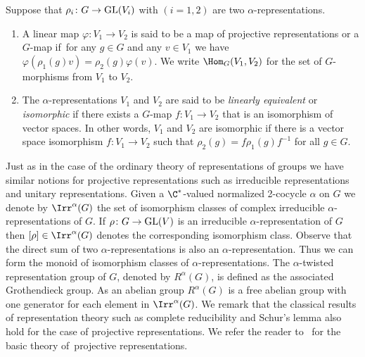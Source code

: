\begin{Def}
Suppose that $\rho_{i}\colon G\rightarrow {\rm GL}(V_{i})$ with $(i=1,2)$ are two $\alpha$-representations.
\begin{enumerate}\itemsep=0pt
\item A linear map $\varphi\colon V_{1}\to V_{2}$ is said to be a map of projective representations or a
$G$-map if~for any $g\in G$ and any $v\in V_{1}$ we have $\varphi(\rho_{1}(g)v)=\rho_{2}(g)\varphi(v)$.
We write $\Hom_{G}(V_{1},V_{2})$ for the set of $G$-morphisms from $V_{1}$ to $V_{2}$.

\item The $\alpha$-representations $V_{1}$ and $V_{2}$
are said to be \textit{linearly equivalent} or \textit{isomorphic} if
there exists a $G$-map $f\colon V_{1}\to V_{2}$ that is an isomorphism of vector spaces.
In other words, $V_{1}$ and $V_{2}$ are isomorphic if there is a vector space
isomorphism $f\colon V_{1}\rightarrow V_{2}$ such that $\rho_{2}(g)=f\rho_{1}(g)f^{-1}$ for all $g\in G$.
\end{enumerate}
\end{Def}

Just as in the case of the ordinary theory of representations of groups
we have similar notions for projective representations such as irreducible representations
and unitary representations. Given a $\C^{\ast}$-valued normalized 2-cocycle $\alpha$ on
$G$ we denote by $\Irr^{\alpha}(G)$ the set of isomorphism classes of
complex irreducible $\alpha$-representations of $G$.
If $\rho\colon G\to {\rm GL}(V)$ is an irreducible $\alpha$-representation of $G$ then $[\rho]\in \Irr^{\alpha}(G)$
denotes the corresponding isomorphism class. Observe that the direct sum of two $\alpha$-representations
is also an $\alpha$-representation. Thus we can form the monoid of isomorphism classes of $\alpha$-representations.
The $\alpha$-twisted representation group of $G$, denoted by $R^{\alpha}(G)$,
is defined as the associated Grothendieck group. As an abelian group $R^{\alpha}(G)$ is a free abelian
group with one generator for each element in $\Irr^{\alpha}(G)$.
We remark that the classical results of representation theory
such as complete reducibility and Schur's lemma also hold for the case of projective representations.
We refer the reader to~\cite{Karpilovsky2} for
the basic theory of~projective representations.

